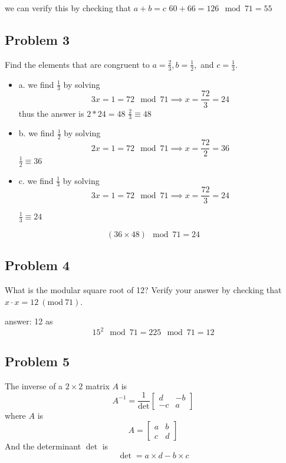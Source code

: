 \documentclass{article}
\begin{document}
    we can verify this by checking that $a + b = c$
    $60 + 66 = 126 \mod 71 = 55$

\subsection*{Problem 3}
Find the elements that are congruent to \( a = \frac{2}{3}, b = \frac{1}{2}, \) and \( c = \frac{1}{3} \).

\begin{itemize}
    \item a.
    we find $\frac{1}{3}$ by solving
    \[
        3x = 1 = 72 \mod 71 \implies x = \frac{72}{3} = 24
    \]
    thus the answer is $2 * 24 = 48$
    $\frac{2}{3} \equiv 48$

    \item b.
    we find $\frac{1}{2}$ by solving
    \[
        2x = 1 = 72 \mod 71 \implies x = \frac{72}{2} = 36
    \]
    $\frac{1}{2} \equiv 36$

    \item c.
    we find $\frac{1}{3}$ by solving
    \[
        3x = 1 = 72 \mod 71 \implies x = \frac{72}{3} = 24
    \]
    
    $\frac{1}{3} \equiv 24$

\end{itemize}

\[
(36 \times 48) \mod 71 = 24
\]

\subsection*{Problem 4}
What is the modular square root of 12?
Verify your answer by checking that \( x \cdot x = 12 \ (\text{mod}\ 71) \).

answer: 12
as
\[15^2 \mod 71 = 225 \mod 71 = 12\]

\subsection*{Problem 5}
The inverse of a \( 2 \times 2 \) matrix \( A \) is
\[
A^{-1} = \frac{1}{\det} \begin{bmatrix} d & -b \\ -c & a \end{bmatrix}
\]
where \( A \) is
\[
A = \begin{bmatrix} a & b \\ c & d \end{bmatrix}
\]
And the determinant \(\det\) is
\[
\det = a \times d - b \times c
\]
\end{document}
